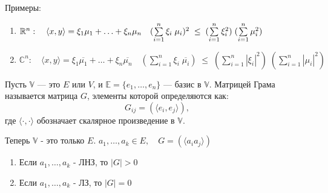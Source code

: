\documentclass[12px]{report}
\begin{document}
\begin{shex}
    Примеры:
    \begin{enumerate}
        \item $\mathbb{R}^n: \quad \langle x, y \rangle = \xi_1 \mu_1 + \ldots + \xi_n \mu_n \quad (\sum\limits_{i = 1}^{n} \xi_i \; \mu_i)^2 \; \leq \; (\sum\limits_{i = 1}^{n} \xi_{i}^2) \; (\sum\limits_{i = 1}^{n} \mu_{i}^2)$
        \item $\mathbb{C}^n: \quad \langle x,y \rangle = \xi_{1} \overline{\mu_{1}} + \ldots + \xi_{n} \overline{\mu_{n}} \quad (\sum\limits_{i = 1}^{n} \xi_{i} \; \overline{\mu_{i}}) \; \leq \; (\sum\limits_{i = 1}^{n} |\xi_{i}|^2) \; (\sum\limits_{i = 1}^{n} |\mu_{i}|^2)$
    \end{enumerate}
\end{shex}

\clearpage
\begin{shdef}
\begin{definition}
    \leavevmode \newline
    Пусть $\mathbb{V}$ — это $E$ или $V$, и $\mathbb{E} = \{e_1, \ldots, e_n\}$ — базис в $\mathbb{V}$. \newline
    Матрицей Грама называется матрица $G$, элементы которой определяются как:
    \[
    G_{ij} = (\langle e_i, e_j \rangle),
    \]
    где $\langle \cdot, \cdot \rangle$ обозначает скалярное произведение в $\mathbb{V}$.
\end{definition}
\end{shdef}

\vspace{0.2cm}

\begin{shth}
    \begin{theorem}
        Теперь $\mathbb{V}$ - это только $E$. \newline
        $a_{1}, \ldots, a_{k} \in E, \quad G = (\langle a_{i} a_{j} \rangle)$
        
        \begin{enumerate}
            \item Если ${a_{1}, \ldots, a_{k}}$ - ЛНЗ, то $|G| > 0$
            \item Если ${a_{1}, \ldots, a_{k}}$ - ЛЗ, то $|G| = 0$
        \end{enumerate}
    \end{theorem}
\end{shth}
\end{document}
